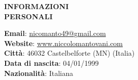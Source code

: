 \begin{minipage}[t]{0.3\textwidth}
		\textbf{INFORMAZIONI \\PERSONALI}
\end{minipage}%
\hfill
\hfill
\begin{minipage}[t]{0.6\textwidth}
	\textbf{Email}: \href{mailto:me@somewhere.com}{nicomanto49@gmail.com} \\
	\textbf{Website}: \url{www.niccolomantovani.com}\\
	\textbf{Città}: 46032 Castelbelforte (MN) (Italia) \\
	\textbf{Data di nascita}: 04/01/1999 \\
	\textbf{Nazionalità}: Italiana\\
\end{minipage}%



